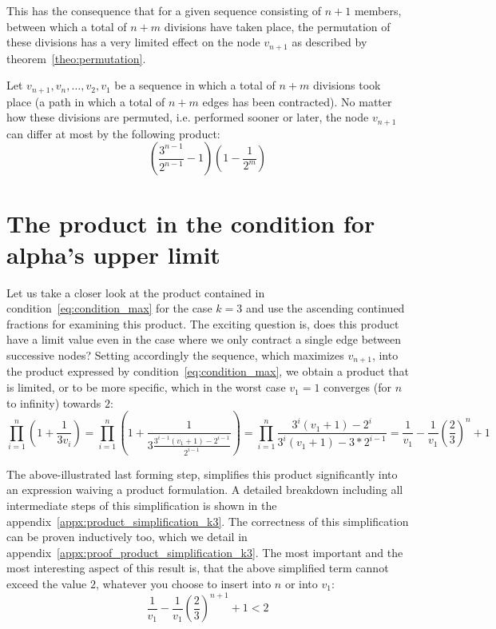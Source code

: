 This has the consequence that for a given sequence consisting of $n+1$ members, between which a total of $n+m$ divisions have taken place, the permutation of these divisions has a very limited effect on the node $v_{n+1}$ as described by theorem~\ref{theo:permutation}.

\par\medskip
\begin{theorem}
	\label{theo:permutation}
	Let $v_{n+1},v_n,\ldots,v_2,v_1$ be a sequence in which a total of $n+m$ divisions took place (a path in which a total of $n+m$ edges has been contracted). No matter how these divisions are permuted, i.e. performed sooner or later, the node $v_{n+1}$ can differ at most by the following product:
	\[
	\left(\frac{3^{n-1}}{2^{n-1}}-1\right)\left(1-\frac{1}{2^m}\right)
	\]
\end{theorem}

\section{The product in the condition for alpha's upper limit}
Let us take a closer look at the product contained in condition~\ref{eq:condition_max} for the case $k=3$ and use the ascending continued fractions for examining this product. The exciting question is, does this product have a limit value even in the case where we only contract a single edge between successive nodes? Setting accordingly the sequence, which maximizes $v_{n+1}$, into the product expressed by condition~\ref{eq:condition_max}, we obtain a product that is limited, or to be more specific, which in the worst case $v_1=1$ converges (for $n$ to infinity) towards $2$:
\begin{equation}
	\label{eq:product_simplification_k3}
	\prod_{i=1}^{n}\left(1+\frac{1}{3v_{i}}\right)
	=\prod_{i=1}^{n}\left(1+\frac{1}{3\frac{3^{i-1}(v_1+1)-2^{i-1}}{2^{i-1}}}\right)
	=\prod_{i=1}^{n}\frac{3^i(v_1+1)-2^i}{3^i(v_1+1)-3*2^{i-1}}
	=\frac{1}{v_1}-\frac{1}{v_1}\left(\frac{2}{3}\right)^n+1
\end{equation}

The above-illustrated last forming step, simplifies this product significantly into an expression waiving a product formulation. A detailed breakdown including all intermediate steps of this simplification is shown in the appendix~\ref{appx:product_simplification_k3}. The correctness of this simplification can be proven inductively too, which we detail in appendix~\ref{appx:proof_product_simplification_k3}. The most important and the most interesting aspect of this result is, that the above simplified term cannot exceed the value $2$, whatever you choose to insert into $n$ or into $v_1$:
\[
\frac{1}{v_1}-\frac{1}{v_1}\left(\frac{2}{3}\right)^{n+1}+1<2
\]

